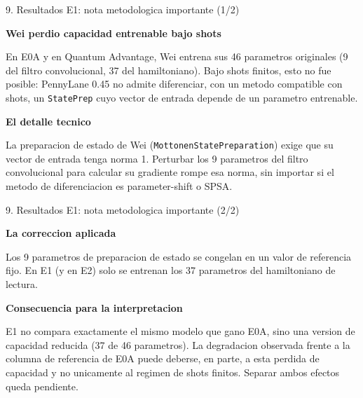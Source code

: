 \documentclass[aspectratio=169]{beamer}
\newcommand{\bmheading}[2]{\textbf{\color{#1}#2}\par\smallskip}
\begin{document}
\begin{frame}{9. Resultados E1: nota metodologica importante (1/2)}
  \begin{amberbox}
    \bmheading{bmAmber}{Wei perdio capacidad entrenable bajo shots}
    En E0A y en Quantum Advantage, Wei entrena sus 46 parametros originales (9
    del filtro convolucional, 37 del hamiltoniano). Bajo shots finitos, esto
    no fue posible: PennyLane 0.45 no admite diferenciar, con un metodo
    compatible con shots, un \texttt{StatePrep} cuyo vector de entrada depende
    de un parametro entrenable.
  \end{amberbox}

  \vspace{10pt}

  \begin{amberbox}
    \bmheading{bmAmber}{El detalle tecnico}
    La preparacion de estado de Wei (\texttt{MottonenStatePreparation}) exige
    que su vector de entrada tenga norma 1. Perturbar los 9 parametros del
    filtro convolucional para calcular su gradiente rompe esa norma, sin
    importar si el metodo de diferenciacion es parameter-shift o SPSA.
  \end{amberbox}
\end{frame}

\begin{frame}{9. Resultados E1: nota metodologica importante (2/2)}
  \begin{greenbox}
    \bmheading{bmGreen}{La correccion aplicada}
    Los 9 parametros de preparacion de estado se congelan en un valor de
    referencia fijo. En E1 (y en E2) solo se entrenan los 37 parametros del
    hamiltoniano de lectura.
  \end{greenbox}

  \vspace{12pt}

  \begin{indigobox}
    \bmheading{bmIndigo}{Consecuencia para la interpretacion}
    E1 no compara exactamente el mismo modelo que gano E0A, sino una version
    de capacidad reducida (37 de 46 parametros). La degradacion observada
    frente a la columna de referencia de E0A puede deberse, en parte, a esta
    perdida de capacidad y no unicamente al regimen de shots finitos. Separar
    ambos efectos queda pendiente.
  \end{indigobox}
\end{frame}
\end{document}
